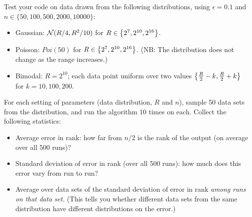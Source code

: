 \documentclass[11pt]{article}
\begin{document}
\begin{enumerate}[leftmargin=\parindent, itemsep=3ex]
           Test your code on data drawn from the following
           distributions, using $\epsilon = 0.1$ and $n \in \{50,100,500, 2000, 10000\}$:
           \begin{itemize}
           \item Gaussian: $\mathcal{N}(R/4, R^2/10)$ for $R \in
             \left\{ 2^7,2^{10}, 2^{16} \right\}$.
           \item Poisson: $\textit{Poi}(50)$ for $R \in 
             \left\{ 2^7,2^{10}, 2^{16} \right\}$. (NB: The distribution does not
             change as the range increases.)
           \item Bimodal: $R=2^{10}$; each data point uniform over two
             values $\left\{ \frac{R}{2}-k, \frac{R}{2}+k \right\}$ for $k = 10, 100, 200$.
             \end{itemize}
             For each setting of parameters (data distribution, $R$
             and $n$), sample 50 data sets from the distribution, and
             run the algorithm 10 times on each. Collect the following
             statistics:
             \begin{itemize}
             \item Average error in rank: how far from $n/2$ is the
               rank of the output (on average over all 500 runs)?
             \item Standard deviation of error in rank (over all 500
               runs): how much does this error vary from run to run?
             \item Average over data sets of the standard deviation of error in rank \emph{among runs on
               that data set.} (This tells you whether different data
             sets from the same distribution have different
             distributions on the error.)
           \end{itemize}

           
             
             

\end{enumerate}
\end{document}
